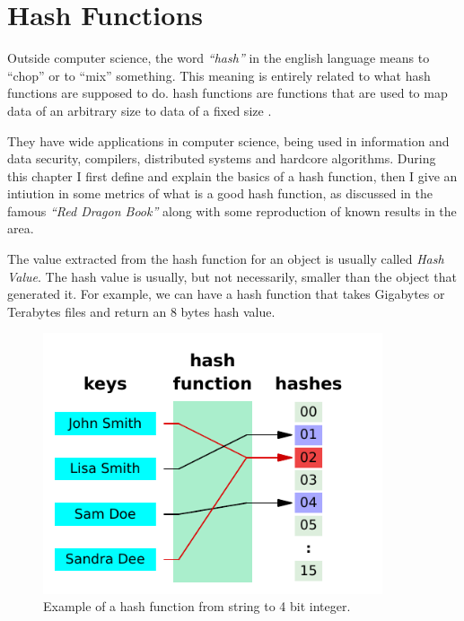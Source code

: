 \chapter{Hash Functions}
\label{cap:Hash Functions}


Outside computer science, the word \textit{``hash''} in the english language means to ``chop'' or to ``mix'' something. This meaning is entirely related to what hash functions are supposed to do. hash functions are functions that are used to map data of an arbitrary size to data of a fixed size \cite{HashFuncWiki}.

They have wide applications in computer science, being used in information and data security, compilers, distributed systems and hardcore algorithms. During this chapter I first define and explain the basics of a hash function, then I give an intiution in some metrics of what is a good hash function, as discussed in the famous \textit{``Red Dragon Book''} \cite{DragonBook} along with some reproduction of known results in the area.

The value extracted from the hash function for an object is usually called \textit{Hash Value}. The hash value is usually, but not necessarily, smaller than the object that generated it. For example, we can have a hash function that takes Gigabytes or Terabytes files and return an 8 bytes hash value.

\begin{figure}[h!]
  \centering
  \includegraphics[width=10cm]{figuras/hash-function.pdf}
  \caption{Example of a hash function from string to 4 bit integer. }
\end{figure}

